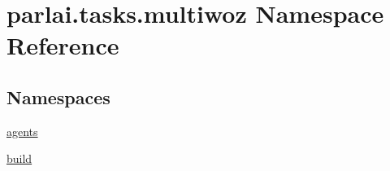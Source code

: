 \hypertarget{namespaceparlai_1_1tasks_1_1multiwoz}{}\section{parlai.\+tasks.\+multiwoz Namespace Reference}
\label{namespaceparlai_1_1tasks_1_1multiwoz}
\subsection*{Namespaces}
\begin{DoxyCompactItemize}
\item 
 \hyperlink{namespaceparlai_1_1tasks_1_1multiwoz_1_1agents}{agents}
\item 
 \hyperlink{namespaceparlai_1_1tasks_1_1multiwoz_1_1build}{build}
\end{DoxyCompactItemize}
